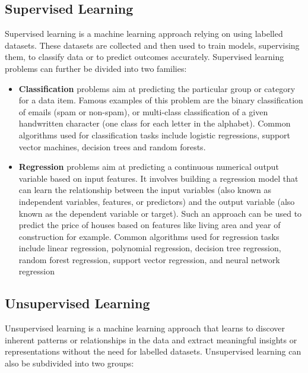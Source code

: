\subsection{Supervised Learning}

Supervised learning is a machine learning approach relying on using labelled datasets. These datasets are collected and then used to train models, \ie supervising them, to classify data or to predict outcomes accurately. Supervised learning problems can further be divided into two families:

\begin{itemize}
    \item \textbf{Classification} problems aim at predicting the particular group or category for a data item. Famous examples of this problem are the binary classification of emails (spam or non-spam), or multi-class classification of a given handwritten character (one class for each letter in the alphabet). Common algorithms used for classification tasks include logistic regressions, support vector machines, decision trees and random forests.

    \item \textbf{Regression} problems aim at predicting a continuous numerical output variable based on input features. It involves building a regression model that can learn the relationship between the input variables (also known as independent variables, features, or predictors) and the output variable (also known as the dependent variable or target). Such an approach can be used to predict the price of houses based on features like living area and year of construction for example. Common algorithms used for regression tasks include linear regression, polynomial regression, decision tree regression, random forest regression, support vector regression, and neural network regression 
\end{itemize}


\subsection{Unsupervised Learning}

Unsupervised learning is a machine learning approach that learns to discover inherent patterns or relationships in the data and extract meaningful insights or representations without the need for labelled datasets. Unsupervised learning can also be subdivided into two groups:

